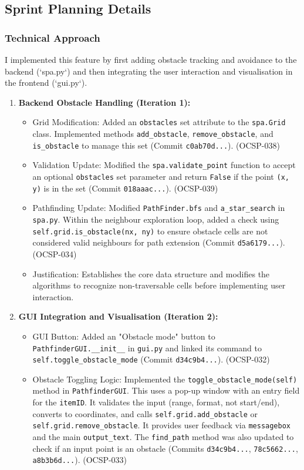 \clearpage
\subsection{Sprint Planning Details}

\subsubsection{Technical Approach}
I implemented this feature by first adding obstacle tracking and avoidance to the backend (`spa.py`) and then integrating the user interaction and visualisation in the frontend (`gui.py`).

\begin{enumerate}
    \item \textbf{Backend Obstacle Handling (Iteration 1):}
    \begin{itemize}
        \item Grid Modification: Added an \verb|obstacles| set attribute to the \verb|spa.Grid| class. Implemented methods \verb|add_obstacle|, \verb|remove_obstacle|, and \verb|is_obstacle| to manage this set (Commit \verb|c0ab70d...|). (OCSP-038)
        \item Validation Update: Modified the \verb|spa.validate_point| function to accept an optional \verb|obstacles| set parameter and return \verb|False| if the point \verb|(x, y)| is in the set (Commit \verb|018aaac...|). (OCSP-039)
        \item Pathfinding Update: Modified \verb|PathFinder.bfs| and \verb|a_star_search| in \verb|spa.py|. Within the neighbour exploration loop, added a check using \verb|self.grid.is_obstacle(nx, ny)| to ensure obstacle cells are not considered valid neighbours for path extension (Commit \verb|d5a6179...|). (OCSP-034)
        \item Justification: Establishes the core data structure and modifies the algorithms to recognize non-traversable cells before implementing user interaction.
    \end{itemize}
    \item \textbf{GUI Integration and Visualisation (Iteration 2):}
    \begin{itemize}
        \item GUI Button: Added an "Obstacle mode" button to \verb|PathfinderGUI.__init__| in \verb|gui.py| and linked its command to \verb|self.toggle_obstacle_mode| (Commit \verb|d34c9b4...|). (OCSP-032)
        \item Obstacle Toggling Logic: Implemented the \verb|toggle_obstacle_mode(self)| method in \verb|PathfinderGUI|. This uses a pop-up window with an entry field for the \verb|itemID|. It validates the input (range, format, not start/end), converts to coordinates, and calls \verb|self.grid.add_obstacle| or \verb|self.grid.remove_obstacle|. It provides user feedback via \verb|messagebox| and the main \verb|output_text|. The \verb|find_path| method was also updated to check if an input point is an obstacle (Commits \verb|d34c9b4...|, \verb|78c5662...|, \verb|a8b3b6d...|). (OCSP-033)

\end{itemize}
\end{enumerate}
